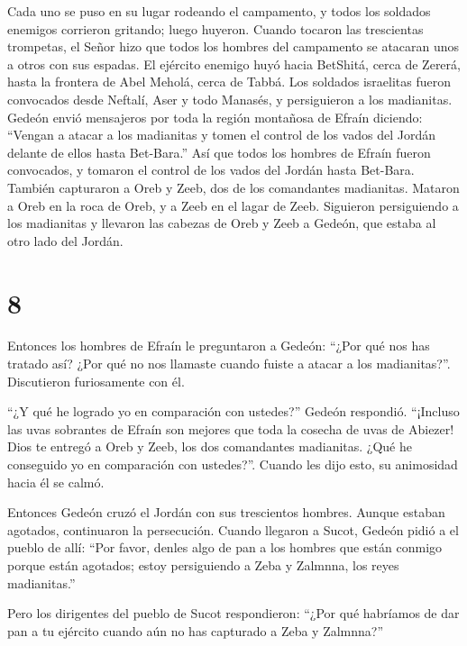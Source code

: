  Cada uno se puso en su lugar rodeando el campamento, y
todos los soldados enemigos corrieron gritando; luego huyeron.
 Cuando tocaron las trescientas trompetas, el Señor hizo
que todos los hombres del campamento se atacaran unos a otros con sus
espadas. El ejército enemigo huyó hacia BetShitá, cerca de Zererá, hasta
la frontera de Abel Meholá, cerca de Tabbá.  Los soldados
israelitas fueron convocados desde Neftalí, Aser y todo Manasés, y
persiguieron a los madianitas.  Gedeón envió mensajeros por
toda la región montañosa de Efraín diciendo: ``Vengan a atacar a los
madianitas y tomen el control de los vados del Jordán delante de ellos
hasta Bet-Bara.'' Así que todos los hombres de Efraín fueron convocados,
y tomaron el control de los vados del Jordán hasta Bet-Bara.
 También capturaron a Oreb y Zeeb, dos de los comandantes
madianitas. Mataron a Oreb en la roca de Oreb, y a Zeeb en el lagar de
Zeeb. Siguieron persiguiendo a los madianitas y llevaron las cabezas de
Oreb y Zeeb a Gedeón, que estaba al otro lado del Jordán.

\hypertarget{section-7}{%
\section{8}\label{section-7}}

 Entonces los hombres de Efraín le preguntaron a Gedeón:
``¿Por qué nos has tratado así? ¿Por qué no nos llamaste cuando fuiste a
atacar a los madianitas?''. Discutieron furiosamente con él.

 ``¿Y qué he logrado yo en comparación con ustedes?'' Gedeón
respondió. ``¡Incluso las uvas sobrantes de Efraín son mejores que toda
la cosecha de uvas de Abiezer!  Dios te entregó a Oreb y
Zeeb, los dos comandantes madianitas. ¿Qué he conseguido yo en
comparación con ustedes?''. Cuando les dijo esto, su animosidad hacia él
se calmó.

 Entonces Gedeón cruzó el Jordán con sus trescientos
hombres. Aunque estaban agotados, continuaron la persecución.
 Cuando llegaron a Sucot, Gedeón pidió a el pueblo de allí:
``Por favor, denles algo de pan a los hombres que están conmigo porque
están agotados; estoy persiguiendo a Zeba y Zalmnna, los reyes
madianitas.''

 Pero los dirigentes del pueblo de Sucot respondieron:
``¿Por qué habríamos de dar pan a tu ejército cuando aún no has
capturado a Zeba y Zalmnna?''


